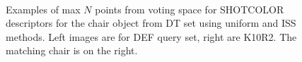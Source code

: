 \documentclass[11pt,a4paper]{kth-mag}
\begin{document}
\begin{figure}
  \centering
  \\
  \caption{Examples of max $N$ points from voting space for SHOTCOLOR descriptors
    for the chair object from DT set using uniform and ISS methods. Left images
    are for DEF query set, right are K10R2. The matching chair is on the right.}
  \label{fig:chairvote_shotc}
\end{figure}
\end{document}
